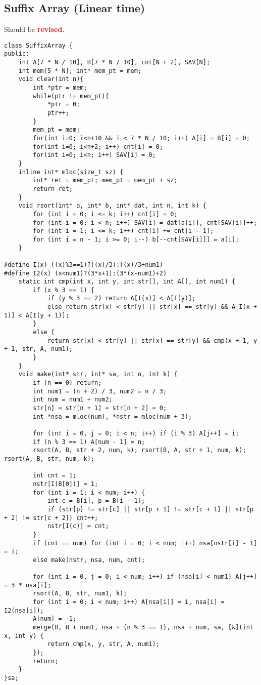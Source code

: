 \documentclass[landscape, 8pt, a4paper, oneside, twocolumn]{extarticle}
\newcommand{\revised}{Should be \textcolor{red}{\textbf{revised}}.}
\begin{document}
\subsection{Suffix Array (Linear time)}
\revised
\begin{verbatim}
class SuffixArray {
public:
	int A[7 * N / 10], B[7 * N / 10], cnt[N + 2], SAV[N];
	int mem[5 * N]; int* mem_pt = mem;
	void clear(int n){
		int *ptr = mem;
		while(ptr != mem_pt){
			*ptr = 0;
			ptr++;
		}
		mem_pt = mem;
		for(int i=0; i<n+10 && i < 7 * N / 10; i++) A[i] = B[i] = 0;
		for(int i=0; i<n+2; i++) cnt[i] = 0;
		for(int i=0; i<n; i++) SAV[i] = 0;
	}
	inline int* mloc(size_t sz) {
		int* ret = mem_pt; mem_pt = mem_pt + sz;
		return ret;
	}
	void rsort(int* a, int* b, int* dat, int n, int k) { 
		for (int i = 0; i <= k; i++) cnt[i] = 0;
		for (int i = 0; i < n; i++) SAV[i] = dat[a[i]], cnt[SAV[i]]++;
		for (int i = 1; i <= k; i++) cnt[i] += cnt[i - 1];
		for (int i = n - 1; i >= 0; i--) b[--cnt[SAV[i]]] = a[i];
	}

#define I(x) ((x)%3==1)?((x)/3):((x)/3+num1)
#define I2(x) (x<num1)?(3*x+1):(3*(x-num1)+2)
	static int cmp(int x, int y, int str[], int A[], int num1) {
		if (x % 3 == 1) {
			if (y % 3 == 2) return A[I(x)] < A[I(y)];
			else return str[x] < str[y] || str[x] == str[y] && A[I(x + 1)] < A[I(y + 1)];
		}
		else {
			return str[x] < str[y] || str[x] == str[y] && cmp(x + 1, y + 1, str, A, num1);
		}
	}
	void make(int* str, int* sa, int n, int k) {
		if (n == 0) return;
		int num1 = (n + 2) / 3, num2 = n / 3;
		int num = num1 + num2;
		str[n] = str[n + 1] = str[n + 2] = 0;
		int *nsa = mloc(num), *nstr = mloc(num + 3);

		for (int i = 0, j = 0; i < n; i++) if (i % 3) A[j++] = i;
		if (n % 3 == 1) A[num - 1] = n;
		rsort(A, B, str + 2, num, k); rsort(B, A, str + 1, num, k); rsort(A, B, str, num, k);

		int cnt = 1;
		nstr[I(B[0])] = 1;
		for (int i = 1; i < num; i++) {
			int c = B[i], p = B[i - 1];
			if (str[p] != str[c] || str[p + 1] != str[c + 1] || str[p + 2] != str[c + 2]) cnt++;
			nstr[I(c)] = cnt;
		}
		if (cnt == num) for (int i = 0; i < num; i++) nsa[nstr[i] - 1] = i;
		else make(nstr, nsa, num, cnt);
		
		for (int i = 0, j = 0; i < num; i++) if (nsa[i] < num1) A[j++] = 3 * nsa[i];
		rsort(A, B, str, num1, k);
		for (int i = 0; i < num; i++) A[nsa[i]] = i, nsa[i] = I2(nsa[i]);
		A[num] = -1;
		merge(B, B + num1, nsa + (n % 3 == 1), nsa + num, sa, [&](int x, int y) {
			return cmp(x, y, str, A, num1); 
		});
		return;
	}
}sa;
\end{verbatim}
\end{document}
